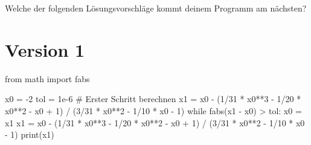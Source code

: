 \documentclass[
  a4paper,
  DIV=11]{scrreprt}
\newenvironment{Shaded}{\begin{snugshade}}{\end{snugshade}}
\newcommand{\BuiltInTok}[1]{\textcolor[rgb]{0.00,0.23,0.31}{#1}}
\newcommand{\CommentTok}[1]{\textcolor[rgb]{0.37,0.37,0.37}{#1}}
\newcommand{\ControlFlowTok}[1]{\textcolor[rgb]{0.00,0.23,0.31}{#1}}
\newcommand{\DecValTok}[1]{\textcolor[rgb]{0.68,0.00,0.00}{#1}}
\newcommand{\FloatTok}[1]{\textcolor[rgb]{0.68,0.00,0.00}{#1}}
\newcommand{\ImportTok}[1]{\textcolor[rgb]{0.00,0.46,0.62}{#1}}
\newcommand{\NormalTok}[1]{\textcolor[rgb]{0.00,0.23,0.31}{#1}}
\newcommand{\OperatorTok}[1]{\textcolor[rgb]{0.37,0.37,0.37}{#1}}
\theoremstyle{definition}
\theoremstyle{definition}
\theoremstyle{remark}
\begin{document}
\begin{tcolorbox}[enhanced jigsaw, titlerule=0mm, title=\textcolor{quarto-callout-tip-color}{\faLightbulb}\hspace{0.5em}{Lösung}, breakable, coltitle=black, leftrule=.75mm, bottomrule=.15mm, colback=white, rightrule=.15mm, opacitybacktitle=0.6, bottomtitle=1mm, toptitle=1mm, left=2mm, toprule=.15mm, colbacktitle=quarto-callout-tip-color!10!white, colframe=quarto-callout-tip-color-frame, arc=.35mm, opacityback=0]

Welche der folgenden Lösungsvorschläge kommt deinem Programm am
nächsten?

\section{Version 1}

\begin{Shaded}
\begin{Highlighting}[]
\ImportTok{from}\NormalTok{ math }\ImportTok{import}\NormalTok{ fabs}

\NormalTok{x0 }\OperatorTok{=} \OperatorTok{{-}}\DecValTok{2}
\NormalTok{tol }\OperatorTok{=} \FloatTok{1e{-}6}
\CommentTok{\# Erster Schritt berechnen}
\NormalTok{x1 }\OperatorTok{=}\NormalTok{ x0 }\OperatorTok{{-}}\NormalTok{ (}\DecValTok{1}\OperatorTok{/}\DecValTok{31} \OperatorTok{*}\NormalTok{ x0}\OperatorTok{**}\DecValTok{3} \OperatorTok{{-}} \DecValTok{1}\OperatorTok{/}\DecValTok{20} \OperatorTok{*}\NormalTok{ x0}\OperatorTok{**}\DecValTok{2} \OperatorTok{{-}}\NormalTok{ x0 }\OperatorTok{+} \DecValTok{1}\NormalTok{) }\OperatorTok{/}\NormalTok{ (}\DecValTok{3}\OperatorTok{/}\DecValTok{31} \OperatorTok{*}\NormalTok{ x0}\OperatorTok{**}\DecValTok{2} \OperatorTok{{-}} \DecValTok{1}\OperatorTok{/}\DecValTok{10} \OperatorTok{*}\NormalTok{ x0 }\OperatorTok{{-}} \DecValTok{1}\NormalTok{)}
\ControlFlowTok{while}\NormalTok{ fabs(x1 }\OperatorTok{{-}}\NormalTok{ x0) }\OperatorTok{\textgreater{}}\NormalTok{ tol:}
\NormalTok{    x0 }\OperatorTok{=}\NormalTok{ x1}
\NormalTok{    x1 }\OperatorTok{=}\NormalTok{ x0 }\OperatorTok{{-}}\NormalTok{ (}\DecValTok{1}\OperatorTok{/}\DecValTok{31} \OperatorTok{*}\NormalTok{ x0}\OperatorTok{**}\DecValTok{3} \OperatorTok{{-}} \DecValTok{1}\OperatorTok{/}\DecValTok{20} \OperatorTok{*}\NormalTok{ x0}\OperatorTok{**}\DecValTok{2} \OperatorTok{{-}}\NormalTok{ x0 }\OperatorTok{+} \DecValTok{1}\NormalTok{) }\OperatorTok{/}\NormalTok{ (}\DecValTok{3}\OperatorTok{/}\DecValTok{31} \OperatorTok{*}\NormalTok{ x0}\OperatorTok{**}\DecValTok{2} \OperatorTok{{-}} \DecValTok{1}\OperatorTok{/}\DecValTok{10} \OperatorTok{*}\NormalTok{ x0 }\OperatorTok{{-}} \DecValTok{1}\NormalTok{)}
\BuiltInTok{print}\NormalTok{(x1)}
\end{Highlighting}
\end{Shaded}


\end{tcolorbox}
\end{document}
